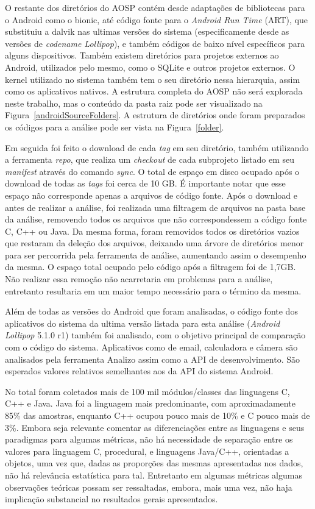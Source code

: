 O restante dos diretórios do AOSP contém desde adaptações de bibliotecas para o Android como o bionic, até código fonte para o \textit{Android Run Time} (ART), que substituiu a dalvik nas ultimas versões do sistema (especificamente desde as versões de \textit{codename Lollipop}), e também códigos de baixo nível específicos para alguns dispositivos. Também existem diretórios para projetos externos ao Android, utilizados pelo mesmo, como o SQLite e outros projetos externos. O kernel utilizado no sistema também tem o seu diretório nessa hierarquia, assim como os aplicativos nativos. A estrutura completa do AOSP não será explorada neste trabalho, mas o conteúdo da pasta raiz pode ser visualizado na Figura~\ref{androidSourceFolders}. A estrutura de diretórios onde foram preparados os códigos para a análise pode ser vista na Figura~\ref{folder}.

Em seguida foi feito o download de cada \textit{tag} em seu diretório, também utilizando a ferramenta \textit{repo}, que realiza um \textit{checkout} de cada subprojeto listado em seu \textit{manifest} através do comando \textit{sync}. O total de espaço em disco ocupado após o download de todas as \textit{tags} foi cerca de 10 GB. É importante notar que esse espaço não corresponde apenas a arquivos de código fonte. Após o download e antes de realizar a análise, foi realizada uma filtragem de arquivos na pasta base da análise, removendo todos os arquivos que não correspondessem a código fonte C, C++ ou Java. Da mesma forma, foram removidos todos os diretórios vazios que restaram da deleção dos arquivos, deixando uma árvore de diretórios menor para ser percorrida pela ferramenta de análise, aumentando assim o desempenho da mesma. O espaço total ocupado pelo código após a filtragem foi de 1,7GB. Não realizar essa remoção não acarretaria em problemas para a análise, entretanto resultaria em um maior tempo necessário para o término da mesma.

Além de todas as versões do Android que foram analisadas, o código fonte dos aplicativos do sistema da ultima versão listada para esta análise (\textit{Android Lollipop} 5.1.0 r1) também foi analisado, com o objetivo principal de comparação com o código do sistema. Aplicativos como de email, calculadora e câmera são analisados pela ferramenta Analizo assim como a API de desenvolvimento. São esperados valores relativos semelhantes aos da API do sistema Android.

No total foram coletados mais de 100 mil módulos/classes das linguagens C, C++ e Java. Java foi a linguagem mais predominante, com aproximadamente 85\% das amostras, enquanto C++ ocupou pouco mais de 10\% e C pouco mais de 3\%. Embora seja relevante comentar as diferenciações entre as linguagens e seus paradigmas para algumas métricas,  não há necessidade de separação entre os valores para linguagem C, procedural, e linguagens Java/C++, orientadas a objetos, uma vez que, dadas as proporções das mesmas apresentadas nos dados, não há relevância estatística para tal. Entretanto em algumas métricas algumas observações teóricas possam ser ressaltadas, embora, mais uma vez, não haja implicação substancial no resultados gerais apresentados.

